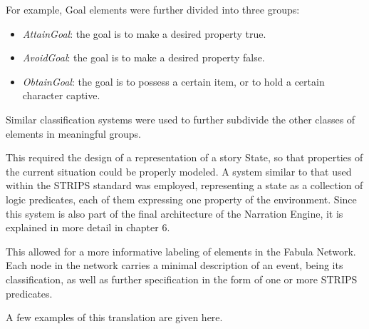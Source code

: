 \documentclass[12pt,a4paper,oneside]{report}
\begin{document}
For example, Goal elements were further divided into three groups:

\begin{itemize}\setlength{\itemsep}{0pt}
\item \textit{AttainGoal}: the goal is to make a desired property true.
\item \textit{AvoidGoal}: the goal is to make a desired property false.
\item \textit{ObtainGoal}: the goal is to possess a certain item, or to hold a certain character captive.
\end{itemize}

Similar classification systems were used to further subdivide the other classes of elements in meaningful groups.

\bigskip

This required the design of a representation of a story State, so that properties of the current situation could be properly modeled. A system similar to that used within the STRIPS standard \cite{strips} was employed, representing a state as a collection of logic predicates, each of them expressing one property of the environment. Since this system is also part of the final architecture of the Narration Engine, it is explained in more detail in chapter 6.

This allowed for a more informative labeling of elements in the Fabula Network. Each node in the network carries a minimal description of an event, being its classification, as well as further specification in the form of one or more STRIPS predicates. 

\bigskip

A few examples of this translation are given here.
\end{document}
